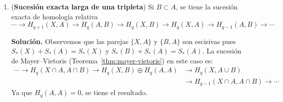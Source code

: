 \documentclass[11pt,a4paper]{article}
\theoremstyle{plain}
\theoremstyle{definition}
\theoremstyle{remark}
\begin{document}
\begin{enumerate}[label=\arabic*.,leftmargin=*]
\noindent\textbf{Solución.} Consideremos el siguiente diagrama
\[
\begin{tikzcd}
\dfrac{S_*(A)}{S_*(A\cap B)} \arrow[rr,"\overline j"] \arrow[dr,swap,"\overline\imath"] & & \dfrac{S_*(X)}{S_*(B)} \\
& \dfrac{S_*(A)+S_*(B)}{S_*(B)} \arrow[ur,swap,"\overline\imath"] &
\end{tikzcd}
\]
También, consideremos el siguiente diagrama:
{\footnotesize
\[
\begin{tikzcd}[column sep=small]
0 \arrow[r] & S_*(B) \arrow[r] \arrow[d,"="] & S_*(A)+S_*(B) \arrow[r] \arrow[d,"i"] & \dfrac{S_*(A)+S_*(B)}{S_*(B)} \arrow[r] \arrow[d,"\overline\imath"] & 0 \\
0 \arrow[r] & S_*(B) \arrow[r] & S_*(X) \arrow[r] & \dfrac{S_*(X)}{S_*(B)} \arrow[r] & 0
\end{tikzcd}
\]
}
Aplicando el teorema fundamental del álgebra homológica se obtiene que
{\scriptsize
\[
\begin{tikzcd}[column sep=4pt]
\cdots \arrow[r] & H_q(B) \arrow[r] \arrow[d,"="] & H_q(S_*(A)+S_*(B)) \arrow[r] \arrow[d,"i_*"] & H_q\left(\dfrac{S_*(A)+S_*(B)}{S_*(B)}\right) \arrow[r] \arrow[d,"\overline\imath_*"] & H_{q-1}(B) \arrow[r] \arrow[d,"="] & H_{q-1}(S_*(A)+S_*(B)) \arrow[r] \arrow[d] & \cdots \\
\cdots \arrow[r] & H_q(B) \arrow[r] & H_q(X) \arrow[r] & H_q(X,B) \arrow[r] & H_{q-1}(B) \arrow[r] & H_{q-1}(X) \arrow[r] & \cdots
\end{tikzcd}
\]
}
Supóngase que la pareja $\{A,B\}$ es escisiva; es decir
$i:S_*(A)+S_*(B)\to S_*(X)$ induce el isomorfismo $i_*$. Por el lema del $5$,
$\overline\imath_*$ es isomorfismo. Ya que $\overline\imath$ es isomorfismo
por Noether (y por lo tanto $\overline\imath_*$ es isomorfismo) se tiene
que $\overline\jmath_*$ es isomorfismo y, así, $j$ es escisión.

Recíprocamente, supongamos que $j$ es escisión. Entonces, $\overline\jmath_*$
es isomorfismo y, por lo tanto, $\overline\imath_*$ es isomorfismo. Por el
lema del $5$, $i_*$ es isomorfismo.

\item (\textbf{Sucesión exacta larga de una tripleta}) Si $B\subset A$, se
tiene la sucesión exacta de homología relativa
\[
\cdots\to H_{q+1}(X,A)\to H_q(A,B)\to H_q(X,B)\to H_q(X,A)\to H_{q-1}(A,B)\to\cdots
\]

\noindent\textbf{Solución.} Observemos que las parejas $\{X,A\}$ y
$\{B,A\}$ son escisivas pues $S_*(X)+S_*(A)=S_*(X)$ y
$S_*(B)+S_*(A)=S_*(A)$. La sucesión de Mayer--Vietoris
(Teorema~\ref{thm:mayer-vietoris}) en este caso es:
\[
\begin{aligned}
\cdots\to H_q(X\cap A,A\cap B)\to H_q(X,B)\oplus H_q(A,A)&\to H_q(X,A\cup B)\\
&\to H_{q-1}(X\cap A,A\cap B)\to\cdots
\end{aligned}
\]
Ya que $H_q(A,A)=0$, se tiene el resultado.


\end{enumerate}
\end{document}
